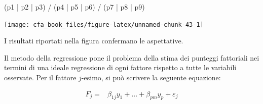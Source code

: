 \documentclass[
  11pt,
]{krantz}
\makeatletter
\newenvironment{Shaded}{\begin{snugshade}}{\end{snugshade}}
\newcommand{\AttributeTok}[1]{\textcolor[rgb]{0.61,0.61,0.61}{#1}}
\newcommand{\DecValTok}[1]{\textcolor[rgb]{0.06,0.06,0.06}{#1}}
\newcommand{\FloatTok}[1]{\textcolor[rgb]{0.06,0.06,0.06}{#1}}
\newcommand{\FunctionTok}[1]{\textcolor[rgb]{0,0,0}{#1}}
\newcommand{\NormalTok}[1]{#1}
\newcommand{\OtherTok}[1]{\textcolor[rgb]{0.37,0.37,0.37}{#1}}
\newcommand{\SpecialCharTok}[1]{\textcolor[rgb]{0,0,0}{#1}}
\newenvironment{kframe}{%
\medskip{}
\setlength{\fboxsep}{.8em}
 \def\at@end@of@kframe{}%
 \ifinner\ifhmode%
  \def\at@end@of@kframe{\end{minipage}}%
  \begin{minipage}{\columnwidth}%
 \fi\fi%
 \def\FrameCommand##1{\hskip\@totalleftmargin \hskip-\fboxsep
 \colorbox{shadecolor}{##1}\hskip-\fboxsep
     \hskip-\linewidth \hskip-\@totalleftmargin \hskip\columnwidth}%
 \MakeFramed {\advance\hsize-\width
   \@totalleftmargin\z@ \linewidth\hsize
   \@setminipage}}%
 {\par\unskip\endMakeFramed%
 \at@end@of@kframe}
\renewenvironment{Shaded}{\begin{kframe}}{\end{kframe}}
\makeatother
\begin{document}
\begin{Shaded}
\end{Shaded}

\begin{Shaded}
\begin{Highlighting}[]
\NormalTok{(p1 }\SpecialCharTok{|}\NormalTok{ p2 }\SpecialCharTok{|}\NormalTok{ p3) }\SpecialCharTok{/}
\NormalTok{  (p4 }\SpecialCharTok{|}\NormalTok{ p5 }\SpecialCharTok{|}\NormalTok{ p6) }\SpecialCharTok{/}
\NormalTok{  (p7 }\SpecialCharTok{|}\NormalTok{ p8 }\SpecialCharTok{|}\NormalTok{ p9)}
\end{Highlighting}
\end{Shaded}

\begin{center}\texttt{[image: cfa\_book\_files/figure-latex/unnamed-chunk-43-1]} \end{center}

I risultati riportati nella figura confermano le aspettative.

Il metodo della regressione pone il problema della stima dei punteggi fattoriali nei termini di una ideale regressione di ogni fattore rispetto a tutte le variabili osservate. Per il fattore \(j\)-esimo, si può scrivere la seguente equazione:

\[
\begin{aligned}
F_j =& \beta_{1j}y_1 + \dots + \beta_{pm}y_p + \varepsilon_j
\end{aligned}
\]
\end{document}
